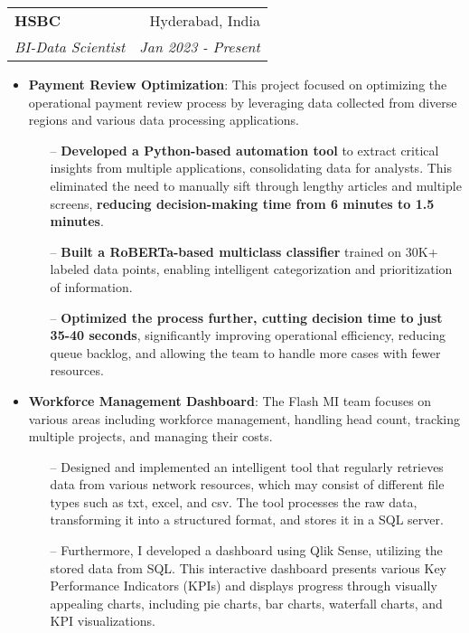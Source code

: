 \documentclass[letterpaper,11pt]{article}
\makeatletter
\newcommand{\resumeItem}[2]{
  \item\small{
    \textbf{#1}{: #2 \vspace{-2pt}}
  }
}
\newcommand{\resumeSubheading}[4]{
  \vspace{-1pt}\item
    \begin{tabular*}{0.97\textwidth}[t]{l@{\extracolsep{\fill}}r}
      \textbf{#1} & #2 \\
      \textit{\small#3} & \textit{\small #4} \\
    \end{tabular*}\vspace{-5pt}
}
\newcommand{\resumeItemListStart}{\begin{itemize}}
\newcommand{\resumeItemListEnd}{\end{itemize}\vspace{-5pt}}
\makeatother
\begin{document}
\resumeSubheading
{HSBC}{Hyderabad, India}
{BI-Data Scientist}{Jan 2023 - Present}
\resumeItemListStart
\resumeItem{Payment Review Optimization}
{ This project focused on optimizing the operational payment review process by leveraging data collected from diverse regions and various data processing applications.}
\begin{itemize}
  \item[--] \textbf {Developed a Python-based automation tool} to extract critical insights from multiple applications, consolidating data for analysts. This eliminated the need to manually sift through lengthy articles and multiple screens, \textbf {reducing decision-making time from 6 minutes to 1.5 minutes}.
  \item[--] \textbf {Built a RoBERTa-based multiclass classifier} trained on 30K+ labeled data points, enabling intelligent categorization and prioritization of information.
  \item[--] \textbf {Optimized the process further, cutting decision time to just 35-40 seconds}, significantly improving operational efficiency, reducing queue backlog, and allowing the team to handle more cases with fewer resources.
\end{itemize}
\resumeItemListEnd

\resumeItemListStart
\resumeItem{Workforce Management Dashboard}
{ The Flash MI team focuses on various areas including workforce management, handling head count, tracking multiple projects, and managing their costs.}
\begin{itemize}
  \item[--] Designed and implemented an intelligent tool that regularly retrieves data from various network resources, which may consist of different file types such as txt, excel, and csv. The tool processes the raw data, transforming it into a structured format, and stores it in a SQL server.
  \item[--] Furthermore, I developed a dashboard using Qlik Sense, utilizing the stored data from SQL. This interactive dashboard presents various Key Performance Indicators (KPIs) and displays progress through visually appealing charts, including pie charts, bar charts, waterfall charts, and KPI visualizations.
\end{itemize}
\resumeItemListEnd
\end{document}
